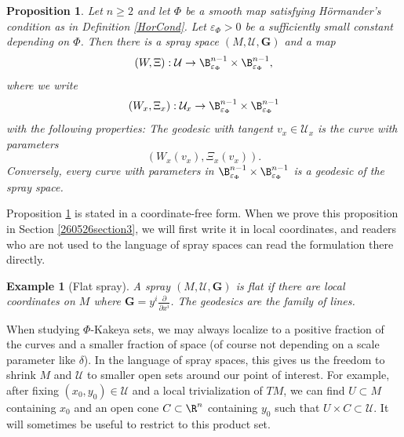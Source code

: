 \documentclass{article}
\newcommand{\bG}{\mathbf{G}}
\numberwithin{equation}{section}
\theoremstyle{plain}
\newtheorem{proposition}[theorem]{Proposition}
\newtheorem{example}[theorem]{Example}
\begin{document}
\begin{proposition}\label{prop: Kakeya to spray space}
Let $n\ge 2$ and let $\Phi$ be a smooth map satisfying H\"ormander's condition as in Definition \ref{HorCond}. Let $\varepsilon_{\Phi}>0$ be a sufficiently small constant depending on $\Phi$. Then there is a spray space $(M, \mathcal U, \bG)$ and a map 
\begin{equation}
(W,\Xi) : \mathcal U \to \mathcal \B^{n-1}_{\varepsilon_{\Phi}} \times \B^{n-1}_{\varepsilon_{\Phi}},
\end{equation}
where we write
\begin{equation}
(W_x,\Xi_x) :\mathcal U_x \to \B^{n-1}_{\varepsilon_{\Phi}} \times \B^{n-1}_{\varepsilon_{\Phi}}
\end{equation}
with the following properties: 
The geodesic with tangent $v_x \in \mathcal U_x$ is the curve with parameters
        \begin{equation}
        (W_x(v_x),\Xi_x(v_x)).
        \end{equation}
         Conversely, every curve with parameters in $\B^{n-1}_{\varepsilon_{\Phi}} \times \B^{n-1}_{\varepsilon_{\Phi}}$ is a geodesic of the spray space.
\end{proposition}

Proposition \ref{prop: Kakeya to spray space} is stated in a coordinate-free form. When we prove this proposition in Section \ref{260526section3}, we will first write it in local coordinates, and readers who are not used to the language of spray spaces can read the formulation there directly. 



\begin{example}[Flat spray]
     A spray $(M,\mathcal U, \bG)$ is flat if there are local coordinates on $M$ where $\bG = y^i \frac{\partial}{\partial x^i}$. The geodesics are the family of lines. 
\end{example}

When studying $\Phi$-Kakeya sets, we may always localize to a positive fraction of the curves and a smaller fraction of space (of course not depending on a scale parameter like $\delta$). In the language of spray spaces, this gives us the freedom to shrink $M$ and $\mathcal U$ to smaller open sets around our point of interest. For example, after fixing $(x_0,y_0) \in \mathcal U$ and a local trivialization of $TM$, we can find $U \subset M$ containing $x_0$ and an open cone $C \subset \R^n$ containing $y_0$ such that $U \times C \subset \mathcal U$. It will sometimes be useful to restrict to this product set. 
\end{document}

